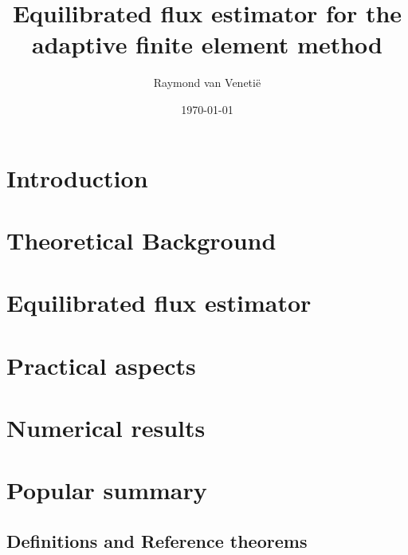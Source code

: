 \documentclass{uvamath}
\title{Equilibrated flux estimator for the adaptive finite element method} %
\author[raymond.van.venetie@gmail.com, 10004627]{Raymond van Veneti\"e} %
\date{\today} %
\theoremstyle{plain}%
\theoremstyle{definition}
\theoremstyle{remark}
\newcommand{\1}{\mathds{1}}
\begin{document}
\maketitle
\begin{abstract}
  
\end{abstract}

\tableofcontents

\chapter*{Introduction}


\chapter{Theoretical Background}


\chapter{Equilibrated flux estimator}


\chapter{Practical aspects}


\chapter{Numerical results}


\chapter*{Popular summary}


\begin{appendices}
%  

\chapter{Definitions and Reference theorems}


\end{appendices}





\end{document}
